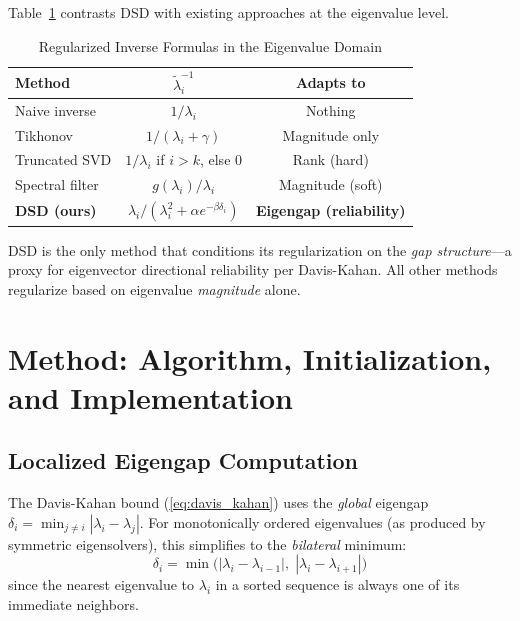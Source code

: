 \documentclass[preprint,review,12pt]{elsarticle}
\begin{document}
Table~\ref{tab:comparison_formula} contrasts DSD with existing approaches at the eigenvalue level.

\begin{table}[!t]
\centering
\caption{Regularized Inverse Formulas in the Eigenvalue Domain}
\label{tab:comparison_formula}
\small
\begin{tabular}{@{}lcc@{}}
\toprule
\textbf{Method} & \textbf{$\tilde{\lambda}_i^{-1}$} & \textbf{Adapts to} \\
\midrule
Naive inverse & $1/\lambda_i$ & Nothing \\
Tikhonov & $1/(\lambda_i + \gamma)$ & Magnitude only \\
Truncated SVD & $1/\lambda_i$ if $i > k$, else 0 & Rank (hard) \\
Spectral filter & $g(\lambda_i)/\lambda_i$ & Magnitude (soft) \\
\textbf{DSD (ours)} & $\lambda_i/(\lambda_i^2 + \alpha e^{-\beta\delta_i})$ & \textbf{Eigengap (reliability)} \\
\bottomrule
\end{tabular}
\end{table}

DSD is the only method that conditions its regularization on the \emph{gap structure}---a proxy for eigenvector directional reliability per Davis-Kahan. All other methods regularize based on eigenvalue \emph{magnitude} alone.


\section{Method: Algorithm, Initialization, and Implementation}
\label{sec:method}

\subsection{Localized Eigengap Computation}
\label{sec:eigengap_computation}

The Davis-Kahan bound (\ref{eq:davis_kahan}) uses the \emph{global} eigengap $\delta_i = \min_{j \neq i} |\lambda_i - \lambda_j|$. For monotonically ordered eigenvalues (as produced by symmetric eigensolvers), this simplifies to the \emph{bilateral} minimum:
\begin{equation}
\delta_i = \min\bigl(|\lambda_i - \lambda_{i-1}|, \; |\lambda_i - \lambda_{i+1}|\bigr)
\label{eq:bilateral_gap}
\end{equation}
since the nearest eigenvalue to $\lambda_i$ in a sorted sequence is always one of its immediate neighbors.
\end{document}
